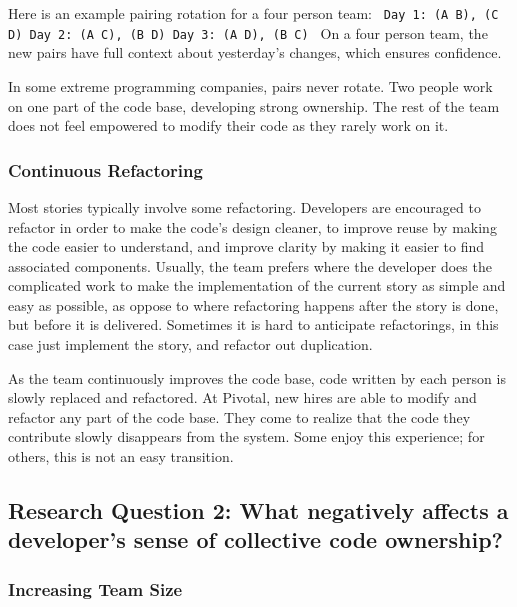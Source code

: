 Here is an example pairing rotation for a four person team: \texttt{
Day 1: (A B), (C D)
Day 2: (A C), (B D)
Day 3: (A D), (B C)
} On a four person team, the new pairs have full context about yesterday's changes, which ensures confidence.

In some extreme programming companies, pairs never rotate. Two people work on one part of the code base, developing strong ownership. The rest of the team does not feel empowered to modify their code as they rarely work on it. 

\subsubsection{Continuous Refactoring}
Most stories typically involve some refactoring. Developers are encouraged to refactor in order to make the code's design cleaner, to improve reuse by making the code easier to understand, and improve clarity by making it easier to find associated components.  Usually, the team prefers  where the developer does the complicated work to make the implementation of the current story as simple and easy as possible, as oppose to  where refactoring happens after the story is done, but before it is delivered.  Sometimes it is hard to anticipate refactorings, in this case just implement the story, and refactor out duplication. 


 As the team continuously improves the code base, code written by each person is slowly replaced and refactored. At Pivotal, new hires are able to modify and refactor any part of the code base. They come to realize that the code they contribute slowly disappears from the system. Some enjoy this experience; for others, this is not an easy transition.


\subsection{Research Question 2: What negatively affects a developer's sense of collective code ownership?}
\subsubsection{Increasing Team Size}

